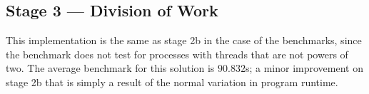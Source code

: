 \documentclass[10pt,a4paper,dvipsnames,cmyk]{scrartcl}
\begin{document}
\subsection*{Stage 3 --- Division of Work}%
\label{sub:division-of-work}


This implementation is the same as stage 2b in the case of the benchmarks,
since the benchmark does not test for processes with threads that are not
powers of two. The average benchmark for this solution is $90.832$s; a
minor improvement on stage 2b that is simply a result of the normal
variation in program runtime.
\end{document}
